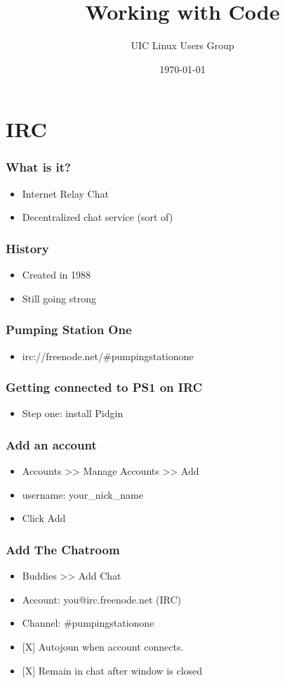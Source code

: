 \documentclass[hyperref={pdfpagelabels=false}]{beamer}
\title{Working with Code}
\author{UIC Linux Users Group}
\date{\today}
\begin{document}
\frame{\titlepage}
\section[outline]{}
\frame{\tableofcontents}
\section{IRC}
		\frame
		{
			\frametitle{What is it?}
			\begin{itemize}
				\item{Internet Relay Chat}
				\item{Decentralized chat service (sort of)}
			\end{itemize}
		}

		\frame
		{
			\frametitle{History}
			\begin{itemize}
				\item{Created in 1988}
				\item{Still going strong}
			\end{itemize}
		}
		\frame
		{
			\frametitle{Pumping Station One}
			\begin{itemize}
				\item{irc://freenode.net/#pumpingstationone}
			\end{itemize}
		}
		\frame
		{
			\frametitle{Getting connected to PS1 on IRC}
			\begin{itemize}
				\item{Step one: install Pidgin}
			\end{itemize}
		}
		\frame
		{
			\frametitle{Add an account}
			\begin{itemize}
				\item{Accounts >> Manage Accounts >> Add}
				\item{username: your_nick_name}
				\item{Click Add}
			\end{itemize}
		}
		\frame
		{
			\frametitle{Add The Chatroom}
			\begin{itemize}
				\item{Buddies >> Add Chat}
				\item{Account: you@irc.freenode.net (IRC)}
				\item{Channel: #pumpingstationone}
				\item{[X] Autojoun when account connects.}
				\item{[X] Remain in chat after window is closed}
			\end{itemize}
		}
\end{document}
